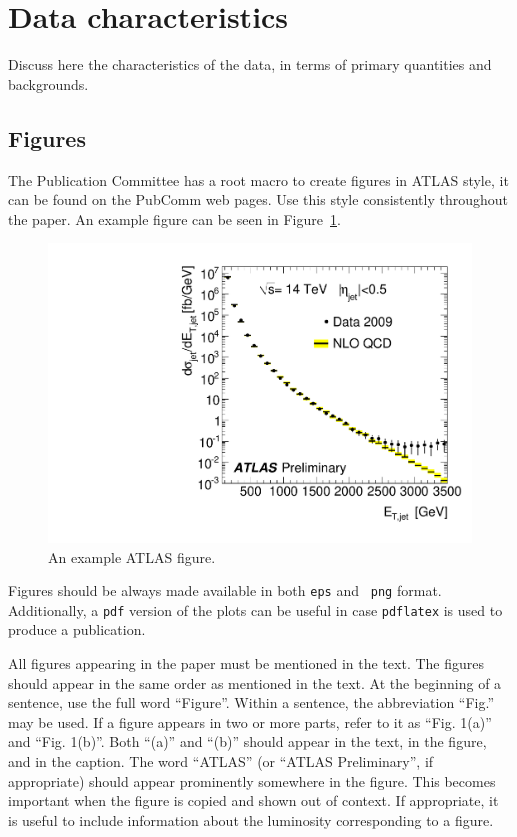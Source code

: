 \documentclass[11pt,a4paper]{atlasnote}
\begin{document}
%
%
\section{Data characteristics}

Discuss here the characteristics of the data, in terms of
primary quantities and backgrounds.

\subsection{Figures}

The Publication Committee has a root macro to create figures in
ATLAS style, it can be found on the PubComm web pages.
Use this style consistently throughout the paper.
An example figure can be seen in Figure~\ref{fig:example}. 

\begin{figure}
  \centering
  \includegraphics[width=\columnwidth]{AtlasExample}
  \caption{An example ATLAS figure.}
  \label{fig:example}
\end{figure}

Figures should be always made available in both {\tt eps} and {\tt
  png} format. Additionally, a {\tt pdf} version of the plots can be
useful in case \verb|pdflatex| is used to produce a publication.

All figures appearing in the paper must be mentioned in the text.
The figures should appear in the same order as mentioned in the text.
At the beginning of a sentence, use the full word ``Figure''.
Within a sentence, the abbreviation ``Fig.'' may be used.
If a figure appears in two or more parts, refer to it as
``Fig. 1(a)'' and ``Fig. 1(b)''. Both ``(a)'' and ``(b)'' should
appear in the text, in the figure, and in the caption.
The word ``ATLAS'' (or ``ATLAS Preliminary'', if appropriate) should
appear prominently somewhere in the figure. This becomes important when
the figure is copied and shown out of context. If appropriate, it
is useful to include information about the luminosity corresponding
to a figure.
\end{document}
